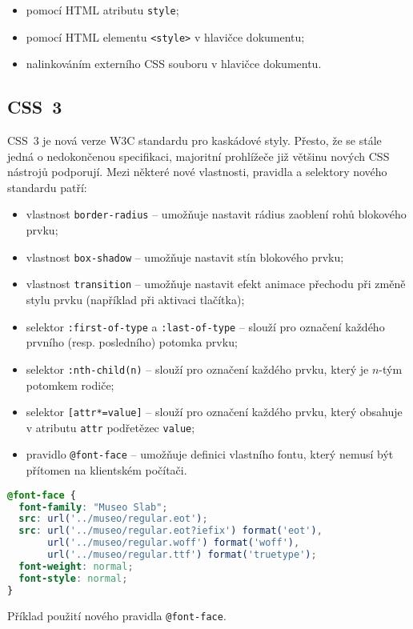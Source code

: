\begin{itemize}
    \item pomocí HTML atributu \texttt{style};
    \item pomocí HTML elementu \texttt{<style>} v hlavičce dokumentu;
    \item nalinkováním externího CSS souboru v hlavičce dokumentu.
\end{itemize}

\subsection{CSS~3}

CSS~3 je nová verze W3C standardu pro kaskádové styly. Přesto, že se stále jedná o nedokončenou specifikaci, majoritní prohlížeče již většinu nových CSS nástrojů podporují. Mezi některé nové vlastnosti, pravidla a selektory nového standardu patří:

\begin{itemize}
    \item vlastnost \texttt{border-radius} -- umožňuje nastavit rádius zaoblení rohů blokového prvku;
    \item vlastnost \texttt{box-shadow} -- umožňuje nastavit stín blokového prvku;
    \item vlastnost \texttt{transition} -- umožňuje nastavit efekt animace přechodu při změně stylu prvku (například při aktivaci tlačítka);
    \item selektor \texttt{:first-of-type} a \texttt{:last-of-type} -- slouží pro označení každého prvního (resp. posledního) potomka prvku;
    \item selektor \texttt{:nth-child(n)} -- slouží pro označení každého prvku, který je $n$-tým potomkem rodiče;
    \item selektor \texttt{[attr*=value]} -- slouží pro označení každého prvku, který obsahuje v atributu \texttt{attr} podřetězec \texttt{value};
    \item pravidlo \texttt{@font-face} -- umožňuje definici vlastního fontu, který nemusí být přítomen na klientském počítači.
\end{itemize}

\begin{example}
    \centering
    \begin{lstlisting}[language=css]
@font-face {
  font-family: "Museo Slab";
  src: url('../museo/regular.eot');
  src: url('../museo/regular.eot?iefix') format('eot'),
       url('../museo/regular.woff') format('woff'),
       url('../museo/regular.ttf') format('truetype');
  font-weight: normal;
  font-style: normal;
}
    \end{lstlisting}
    \caption{Příklad použití nového pravidla \texttt{@font-face}.}
    \label{example:font-face}
\end{example}

